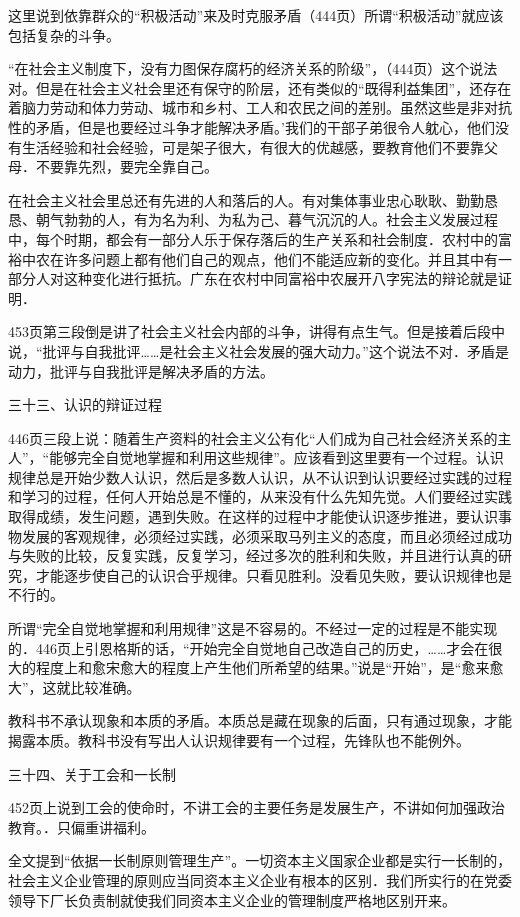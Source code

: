 这里说到依靠群众的“积极活动”来及时克服矛盾（444页）所谓“积极活动”就应该包括复杂的斗争。

“在社会主义制度下，没有力图保存腐朽的经济关系的阶级”，（444页）这个说法对。但是在社会主义社会里还有保守的阶层，还有类似的“既得利益集团”，还存在着脑力劳动和体力劳动、城市和乡村、工人和农民之间的差别。虽然这些是非对抗性的矛盾，但是也要经过斗争才能解决矛盾。’我们的干部子弟很令人躭心，他们没有生活经验和社会经验，可是架子很大，有很大的优越感，要教育他们不要靠父母．不要靠先烈，要完全靠自己。

在社会主义社会里总还有先进的人和落后的人。有对集体事业忠心耿耿、勤勤恳恳、朝气勃勃的人，有为名为利、为私为己、暮气沉沉的人。社会主义发展过程中，每个时期，都会有一部分人乐于保存落后的生产关系和社会制度．农村中的富裕中农在许多问题上都有他们自己的观点，他们不能适应新的变化。并且其中有一部分人对这种变化进行抵抗。广东在农村中同富裕中农展开八字宪法的辩论就是证明．

453页第三段倒是讲了社会主义社会内部的斗争，讲得有点生气。但是接着后段中说，“批评与自我批评……是社会主义社会发展的强大动力。”这个说法不对．矛盾是动力，批评与自我批评是解决矛盾的方法。

三十三、认识的辩证过程

446页三段上说：随着生产资料的社会主义公有化“人们成为自己社会经济关系的主人”，“能够完全自觉地掌握和利用这些规律”。应该看到这里要有一个过程。认识规律总是开始少数人认识，然后是多数人认识，从不认识到认识要经过实践的过程和学习的过程，任何人开始总是不懂的，从来没有什么先知先觉。人们要经过实践取得成绩，发生问题，遇到失败。在这样的过程中才能使认识逐步推进，要认识事物发展的客观规律，必须经过实践，必须采取马列主义的态度，而且必须经过成功与失败的比较，反复实践，反复学习，经过多次的胜利和失败，并且进行认真的研究，才能逐步使自己的认识合乎规律。只看见胜利。没看见失败，要认识规律也是不行的。

所谓“完全自觉地掌握和利用规律”这是不容易的。不经过一定的过程是不能实现的．446页上引恩格斯的话，“开始完全自觉地自己改造自己的历史，……才会在很大的程度上和愈宋愈大的程度上产生他们所希望的结果。”说是“开始”，是“愈来愈大”，这就比较准确。

教科书不承认现象和本质的矛盾。本质总是藏在现象的后面，只有通过现象，才能揭露本质。教科书没有写出人认识规律要有一个过程，先锋队也不能例外。

三十四、关于工会和一长制

452页上说到工会的使命时，不讲工会的主要任务是发展生产，不讲如何加强政治教育。．只偏重讲福利。

全文提到“依据一长制原则管理生产”。一切资本主义国家企业都是实行一长制的，社会主义企业管理的原则应当同资本主义企业有根本的区别．我们所实行的在党委领导下厂长负责制就使我们同资本主义企业的管理制度严格地区别开来。

